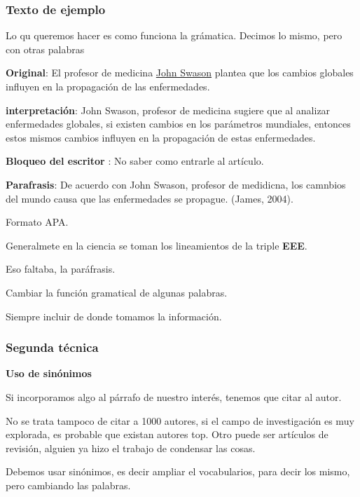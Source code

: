 \documentclass{article}
\begin{document}
\subsubsection{Texto de ejemplo} \vspace{0.5cm}


Lo qu queremos hacer es como funciona la grámatica. Decimos lo mismo, pero con otras palabras


\textbf{Original}: El profesor de medicina \underline{John Swason} plantea que los cambios globales influyen en la propagación de las enfermedades. \vspace{0.5cm}


\textbf{interpretación}:  John Swason, profesor de medicina sugiere que al analizar enfermedades globales, si existen cambios en los parámetros mundiales, entonces estos mismos cambios influyen en la propagación de estas enfermedades. 


\textbf{Bloqueo del escritor} : No saber como entrarle al artículo. 

\textbf{Parafrasis}: De acuerdo con John Swason, profesor de medidicna, los camnbios del mundo causa que las enfermedades se propague. (James, 2004).

Formato APA.

Generalmete en la ciencia se toman los lineamientos de la triple \textbf{EEE}.

Eso faltaba, la paráfrasis.

Cambiar la función gramatical de algunas palabras. 

Siempre incluir de donde tomamos la información. 


\subsubsection{Segunda técnica} \vspace{0.5cm}

\textbf{Uso de sinónimos} \vspace{0.5cm}

Si incorporamos algo al párrafo de nuestro interés, tenemos que citar al autor.

No se trata tampoco de citar a 1000 autores, si el campo de investigación es muy explorada, es probable que existan autores top. Otro puede ser artículos de revisión, alguien ya hizo el trabajo de condensar las cosas.

Debemos usar sinónimos, es decir ampliar el vocabularios, para decir los mismo, pero cambiando las palabras. 
\end{document}
